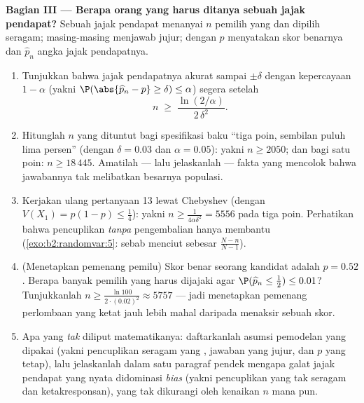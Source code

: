 \begin{problem}
\medskip
\noindent\textbf{Bagian III --- Berapa orang yang harus ditanya sebuah
jajak pendapat?} Sebuah jajak pendapat menanyai $n$ pemilih yang  dan dipilih seragam;
masing-masing menjawab jujur; dengan $p$ menyatakan skor benarnya dan $\widehat p_n$
angka jajak pendapatnya.
\begin{enumerate}[resume]
  \item Tunjukkan bahwa jajak pendapatnya akurat sampai $\pm\delta$ dengan
        kepercayaan $1 - \alpha$ (yakni
        $\P(\abs{\widehat p_n - p} \geq \delta) \leq \alpha$)
        segera setelah
        \[
        n \;\geq\; \frac{\ln(2/\alpha)}{2\,\delta^2} .
        \]
  \item Hitunglah $n$ yang dituntut bagi spesifikasi baku ``tiga
        poin, sembilan puluh lima persen'' (dengan $\delta
        = 0.03$ dan $\alpha = 0.05$): yakni $n \geq 2050$; dan bagi satu
        poin: $n \geq 18\,445$. Amatilah --- lalu jelaskanlah ---
        fakta yang mencolok bahwa jawabannya tak melibatkan
        besarnya populasi.
  \item Kerjakan ulang pertanyaan 13 lewat Chebyshev (dengan $V(X_1) = p(1-p)
        \leq \frac14$): yakni $n \geq \frac1{4\alpha\delta^2} =
        5556$ pada tiga poin. Perhatikan bahwa pencuplikan
        \emph{tanpa} pengembalian hanya membantu
        (\cref{exo:b2:randomvar:5}: sebab  menciut sebesar
        $\frac{N-n}{N-1}$).
  \item (Menetapkan pemenang pemilu) Skor benar seorang kandidat adalah $p
        = 0.52$. Berapa banyak pemilih yang harus dijajaki agar
        $\P(\widehat p_n \leq \tfrac12) \leq 0.01$? Tunjukkanlah $n
        \geq \frac{\ln 100}{2\cdot(0.02)^2} \approx 5757$ ---
        jadi menetapkan pemenang perlombaan yang ketat jauh lebih mahal daripada menaksir sebuah
        skor.
  \item Apa yang \emph{tak} diliput matematikanya: daftarkanlah
        asumsi pemodelan yang dipakai (yakni pencuplikan seragam yang ,
        jawaban yang jujur, dan $p$ yang tetap), lalu jelaskanlah dalam
        satu paragraf pendek mengapa galat jajak pendapat yang nyata
        didominasi \emph{bias} (yakni pencuplikan yang tak seragam dan
        ketakresponsan), yang tak dikurangi oleh kenaikan $n$ mana pun.
\end{enumerate}


\end{problem}
